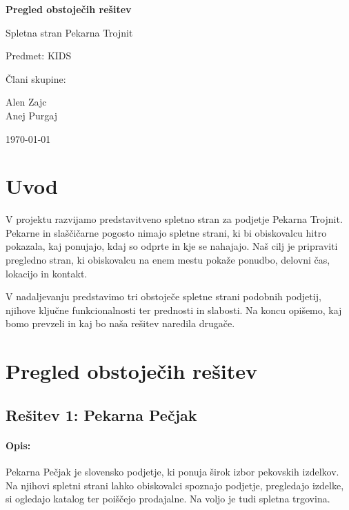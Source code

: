 \documentclass[a4paper,12pt]{article}
\begin{document}
\begin{titlepage}
  \centering
  \vspace*{3cm}
  {\Huge\bfseries Pregled obstoječih rešitev\par}
  \vspace{1cm}
  {\Large Spletna stran Pekarna Trojnit\par}
  \vspace{2cm}
  {\large Predmet: KIDS\par}
  \vspace{2cm}
  {\large Člani skupine:\par}
  \vspace{0.5cm}
  {\large
    Alen Zajc\\
    Anej Purgaj\\
  \par}
  \vfill
  {\large \today\par}
\end{titlepage}

\tableofcontents
\newpage

\section{Uvod}

V projektu razvijamo predstavitveno spletno stran za podjetje Pekarna Trojnit.
Pekarne in slaščičarne pogosto nimajo spletne strani, ki bi obiskovalcu hitro pokazala,
kaj ponujajo, kdaj so odprte in kje se nahajajo. Naš cilj je pripraviti pregledno stran,
ki obiskovalcu na enem mestu pokaže ponudbo, delovni čas, lokacijo in kontakt.

V nadaljevanju predstavimo tri obstoječe spletne strani podobnih podjetij, njihove ključne
funkcionalnosti ter prednosti in slabosti. Na koncu opišemo, kaj bomo prevzeli
in kaj bo naša rešitev naredila drugače.

\section{Pregled obstoječih rešitev}

\subsection{Rešitev 1: Pekarna Pečjak}

\paragraph{Opis:}
Pekarna Pečjak je slovensko podjetje, ki ponuja širok izbor pekovskih izdelkov. Na njihovi spletni strani lahko obiskovalci spoznajo podjetje, pregledajo izdelke, si ogledajo katalog ter poiščejo prodajalne. Na voljo je tudi spletna trgovina.
\end{document}
